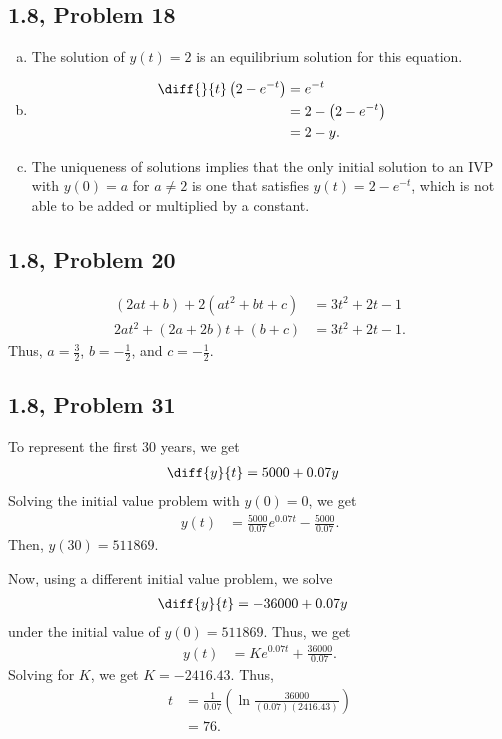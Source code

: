 \documentclass[10pt]{mypackage}
\begin{document}
\subsection{1.8, Problem 18}%
\begin{enumerate}[(a)]
  \item The solution of $y(t) = 2$ is an equilibrium solution for this equation.
  \item 
    \begin{align*}
      \diff{}{t}\left(2-e^{-t}\right) &= e^{-t}\\
                                      &= 2 - \left(2-e^{-t}\right)\\
                                      &= 2-y.
    \end{align*}
  \item The uniqueness of solutions implies that the only initial solution to an IVP with $y(0) = a$ for $a\neq 2$ is one that satisfies $y(t) = 2-e^{-t}$, which is not able to be added or multiplied by a constant.
\end{enumerate}
\subsection{1.8, Problem 20}%
\begin{align*}
  \left(2at + b\right) + 2\left(at^2 + bt + c\right) &= 3t^2 + 2t - 1\\
  2at^2 + \left(2a + 2b\right)t + \left(b+c\right) &= 3t^2 + 2t - 1.
\end{align*}
Thus, $a = \frac{3}{2}$, $b = -\frac{1}{2}$, and $c = -\frac{1}{2}$.
\subsection{1.8, Problem 31}%
To represent the first 30 years, we get
\begin{align*}
  \diff{y}{t} &= 5000 + 0.07y
\end{align*}
Solving the initial value problem with $y(0) = 0$, we get
\begin{align*}
  y(t) &= \frac{5000}{0.07}e^{0.07t} - \frac{5000}{0.07}.
\end{align*}
Then, $y(30) = 511869$.\newline

Now, using a different initial value problem, we solve
\begin{align*}
  \diff{y}{t} &= -36000 + 0.07y
\end{align*}
under the initial value of $y(0) = 511869$. Thus, we get
\begin{align*}
  y(t) &= Ke^{0.07t} + \frac{36000}{0.07}.
\end{align*}
Solving for $K$, we get $K = -2416.43$. Thus,
\begin{align*}
  t &= \frac{1}{0.07}\left(\ln\frac{36000}{(0.07)(2416.43)}\right)\\
    &= 76.
\end{align*}
\end{document}
